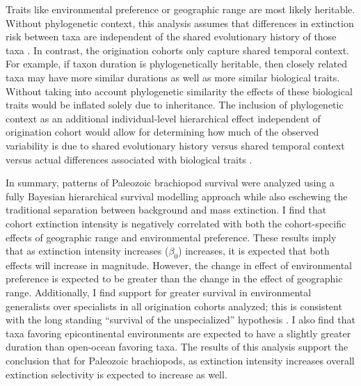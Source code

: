 \documentclass{article}
\begin{document}
Traits like environmental preference or geographic range \citep{Jablonski1987,Hunt2005b} are most likely heritable. Without phylogenetic context, this analysis assumes that differences in extinction risk between taxa are independent of the shared evolutionary history of those  taxa \citep{Felsenstein1985b}. In contrast, the origination cohorts only capture shared temporal context. For example, if taxon duration is phylogenetically heritable, then closely related taxa may have more similar durations as well as more similar biological traits. Without taking into account phylogenetic similarity the effects of these biological traits would be inflated solely due to inheritance. The inclusion of phylogenetic context as an additional individual-level hierarchical effect independent of origination cohort would allow for determining how much of the observed variability is due to shared evolutionary history versus shared temporal context versus actual differences associated with biological traits \citep{Harnik2014,Smits2015}. 


In summary, patterns of Paleozoic brachiopod survival were analyzed using a fully Bayesian hierarchical survival modelling approach while also eschewing the traditional separation between background and mass extinction. I find that cohort extinction intensity is negatively correlated with both the cohort-specific effects of geographic range and environmental preference. These results imply that as extinction intensity increases (\(\beta_{0}\)) increases, it is expected that both effects will increase in magnitude. However, the change in effect of environmental preference is expected to be greater than the change in the effect of geographic range. Additionally, I find support for greater survival in environmental generalists over specialists in all origination cohorts analyzed; this is consistent with the long standing ``survival of the unspecialized'' hypothesis \citep{Liow2004a,Liow2007b,Simpson1944,Simpson1953,Smits2015,Nurnberg2015,Nurnberg2013a, Baumiller1993}. I also find that taxa favoring epicontinental environments are expected to have a slightly greater duration than open-ocean favoring taxa. The results of this analysis support the conclusion that for Paleozoic brachiopods, as extinction intensity increases overall extinction selectivity is expected to increase as well.
\end{document}
